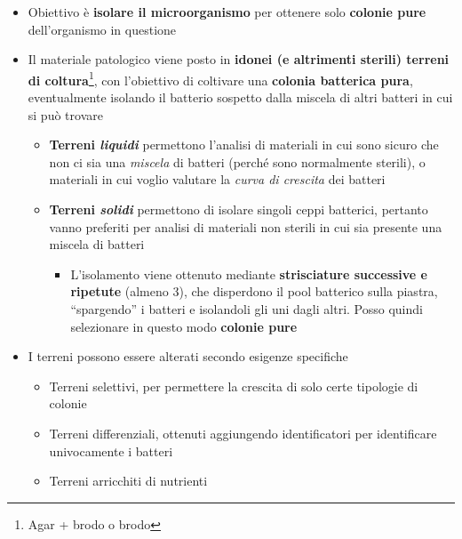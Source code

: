 \documentclass[italian,]{article}
\providecommand{\tightlist}{%
  \setlength{\itemsep}{0pt}\setlength{\parskip}{0pt}}
\newcommand{\asidefigure}[2]{\marginpar{\phantom{Img:}\newline\texttt{[image: \#1]}\\\footnotesize\emph{#2}}}
\begin{document}
\begin{itemize}
\tightlist
\item
  Obiettivo è \textbf{isolare il microorganismo} per ottenere solo
  \textbf{colonie pure} dell'organismo in questione
\item
  Il materiale patologico viene posto in \textbf{idonei (e altrimenti
  sterili) terreni di coltura}\footnote{Agar + brodo o brodo}, con
  l'obiettivo di coltivare una \textbf{colonia batterica pura},
  eventualmente isolando il batterio sospetto dalla miscela di altri
  batteri in cui si può trovare

  \begin{itemize}
  \tightlist
  \item
    \textbf{Terreni \emph{liquidi} } permettono l'analisi di materiali
    in cui sono sicuro che non ci sia una \emph{miscela} di batteri
    (perché sono normalmente sterili), o materiali in cui voglio
    valutare la \emph{curva di crescita} dei batteri
  \item
    \textbf{Terreni \emph{solidi} } permettono di isolare singoli ceppi
    batterici, pertanto vanno preferiti per analisi di materiali non
    sterili in cui sia presente una miscela di batteri

    \begin{itemize}
    \tightlist
    \item
      \asidefigure{img/tecnica-3-strisciature.png}{} L'isolamento viene
      ottenuto mediante \textbf{strisciature successive e ripetute}
      (almeno 3), che disperdono il pool batterico sulla piastra,
      ``spargendo'' i batteri e isolandoli gli uni dagli altri. Posso
      quindi selezionare in questo modo \textbf{colonie pure}
    \end{itemize}
  \end{itemize}
\item
  I terreni possono essere alterati secondo esigenze specifiche

  \begin{itemize}
  \tightlist
  \item
    Terreni selettivi, per permettere la crescita di solo certe
    tipologie di colonie
  \item
    Terreni differenziali, ottenuti aggiungendo identificatori per
    identificare univocamente i batteri
  \item
    Terreni arricchiti di nutrienti
  \end{itemize}
\end{itemize}
\end{document}
